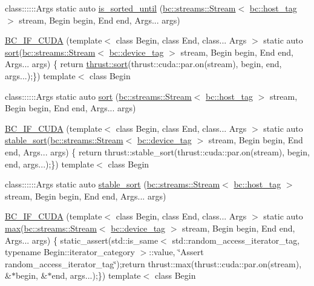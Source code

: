 \begin{DoxyCompactItemize}
\item 
class\+::::::\+Args static auto \hyperlink{namespacebc_1_1algorithms_ae61a19a001cd4acf6528f9bf5e6aef32}{is\+\_\+sorted\+\_\+until} (\hyperlink{classbc_1_1streams_1_1Stream}{bc\+::streams\+::\+Stream}$<$ \hyperlink{structbc_1_1host__tag}{bc\+::host\+\_\+tag} $>$ stream, Begin begin, End end, Args... args)
\item 
\hyperlink{namespacebc_1_1algorithms_adab5c8ffaca0db90c63b1ef77019fb5f}{B\+C\+\_\+\+I\+F\+\_\+\+C\+U\+DA} (template$<$ class Begin, class End, class... Args $>$ static auto \hyperlink{namespacebc_1_1algorithms_ace8c8eef42a9a58eb05722b682f38f69}{sort}(\hyperlink{classbc_1_1streams_1_1Stream}{bc\+::streams\+::\+Stream}$<$ \hyperlink{structbc_1_1device__tag}{bc\+::device\+\_\+tag} $>$ stream, Begin begin, End end, Args... args) \{ return \hyperlink{tensor__iteralgos_8h_a00092f5e74737e013885b09b9c76db9b}{thrust\+::sort}(thrust\+::cuda\+::par.\+on(stream), begin, end, args...);\}) template$<$ class Begin
\item 
class\+::::::\+Args static auto \hyperlink{namespacebc_1_1algorithms_ace8c8eef42a9a58eb05722b682f38f69}{sort} (\hyperlink{classbc_1_1streams_1_1Stream}{bc\+::streams\+::\+Stream}$<$ \hyperlink{structbc_1_1host__tag}{bc\+::host\+\_\+tag} $>$ stream, Begin begin, End end, Args... args)
\item 
\hyperlink{namespacebc_1_1algorithms_a22a806056dfc049cc3fd8612c6459f21}{B\+C\+\_\+\+I\+F\+\_\+\+C\+U\+DA} (template$<$ class Begin, class End, class... Args $>$ static auto \hyperlink{namespacebc_1_1algorithms_a3a3cce900a03fac5d37184bd7a2faf52}{stable\+\_\+sort}(\hyperlink{classbc_1_1streams_1_1Stream}{bc\+::streams\+::\+Stream}$<$ \hyperlink{structbc_1_1device__tag}{bc\+::device\+\_\+tag} $>$ stream, Begin begin, End end, Args... args) \{ return thrust\+::stable\+\_\+sort(thrust\+::cuda\+::par.\+on(stream), begin, end, args...);\}) template$<$ class Begin
\item 
class\+::::::\+Args static auto \hyperlink{namespacebc_1_1algorithms_a3a3cce900a03fac5d37184bd7a2faf52}{stable\+\_\+sort} (\hyperlink{classbc_1_1streams_1_1Stream}{bc\+::streams\+::\+Stream}$<$ \hyperlink{structbc_1_1host__tag}{bc\+::host\+\_\+tag} $>$ stream, Begin begin, End end, Args... args)
\item 
\hyperlink{namespacebc_1_1algorithms_a9ba98264154ac75b0f8fadf3fbcac557}{B\+C\+\_\+\+I\+F\+\_\+\+C\+U\+DA} (template$<$ class Begin, class End, class... Args $>$ static auto \hyperlink{namespacebc_1_1algorithms_a8dc3d1069caa869dfff3d0b9c7b52325}{max}(\hyperlink{classbc_1_1streams_1_1Stream}{bc\+::streams\+::\+Stream}$<$ \hyperlink{structbc_1_1device__tag}{bc\+::device\+\_\+tag} $>$ stream, Begin begin, End end, Args... args) \{ static\+\_\+assert(std\+::is\+\_\+same$<$ std\+::random\+\_\+access\+\_\+iterator\+\_\+tag, typename Begin\+::iterator\+\_\+category $>$\+::value, \char`\"{}Assert random\+\_\+access\+\_\+iterator\+\_\+tag\char`\"{});return thrust\+::max(thrust\+::cuda\+::par.\+on(stream), \&$\ast$begin, \&$\ast$end, args...);\}) template$<$ class Begin

\end{DoxyCompactItemize}
